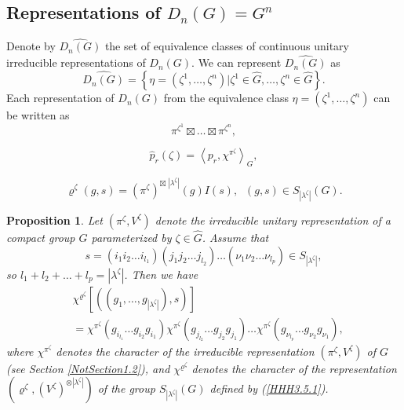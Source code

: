 \documentclass[10pt,a4paper]{amsart}
\newtheorem{prop}{Proposition}
\begin{document}
\subsection{Representations of $D_n(G)=G^n$}\label{SubsectionDn}
Denote by $\widehat{D_n(G)}$ the set of equivalence classes of continuous unitary irreducible representations of $D_n(G)$.  We can represent $\widehat{D_n(G)}$ as
$$
\widehat{D_n(G)}=\left\{\eta=\left(\zeta^1,\ldots,\zeta^n\right)\vert
\zeta^1\in\widehat{G},\ldots,\zeta^n\in\widehat{G}\right\}.
$$
Each representation of $D_n(G)$ from the equivalence class $\eta=\left(\zeta^1,\ldots,\zeta^n\right)$ can be written as
\begin{equation}\label{reps1}
\pi^{\zeta^1}\boxtimes\ldots\boxtimes\pi^{\zeta^n},
\end{equation}

\begin{equation}\label{ch1.3.3}
\widehat{p}_r(\zeta)=\left<p_r,\chi^{\pi^{\zeta}}\right>_G,
\end{equation}

\begin{equation}\label{HHH3.5.1}
\varrho^{\zeta}(g,s)=\left(\pi^{\zeta}\right)^{\boxtimes\; |\lambda^{\zeta}|}
(g)I(s),\;\;(g,s)\in S_{|\lambda^{\zeta}|}(G).
\end{equation}

\begin{prop}\label{chchiProposition5.1.5}
Let $\left(\pi^{\zeta},V^{\zeta}\right)$ denote the irreducible unitary representation of
a compact group $G$ parameterized by $\zeta\in\widehat{G}$. Assume that
\begin{equation}\label{chchi5.1.2}
s=\left(i_1i_2\ldots i_{l_1}\right)\left(j_1j_2\ldots j_{l_2}\right)\ldots\left(\nu_1\nu_2\ldots\nu_{l_p}\right)\in S_{|\lambda^{\zeta}|},
\end{equation}
so $l_1+l_2+\ldots+l_p=|\lambda^{\zeta}|$.
Then we have
\begin{equation}\label{chchi5.1.3}
\begin{split}
&\chi^{\varrho^{\zeta}}\left[\left((g_1,\ldots,g_{|\lambda^{\zeta}|}),s\right)\right]\\
&=\chi^{\pi^{\zeta}}\left(g_{i_{l_1}}\ldots g_{i_2}g_{i_1}\right)
\chi^{\pi^{\zeta}}\left(g_{j_{l_2}}\ldots g_{j_2}g_{j_1}\right)
\ldots \chi^{\pi^{\zeta}}\left(g_{\nu_{l_p}}\ldots g_{\nu_2}g_{\nu_1}\right),
\end{split}
\end{equation}
where $\chi^{\pi^{\zeta}}$ denotes the character of the irreducible representation $\left(\pi^{\zeta},V^{\zeta}\right)$
of $G$ (see Section \ref{NotSection1.2}),
and $\chi^{\varrho^{\zeta}}$ denotes the character of the representation
$\left(\varrho^{\zeta},\left(V^{\zeta}\right)^{\otimes |\lambda^{\zeta}|}\right)$ of the group
$S_{|\lambda^{\zeta}|}(G)$ defined by (\ref{HHH3.5.1}).
\end{prop}
\end{document}
